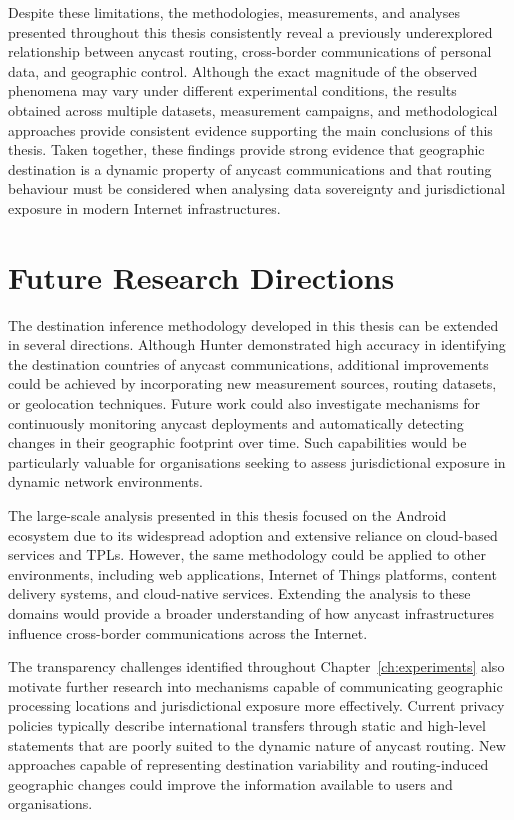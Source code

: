 Despite these limitations, the methodologies, measurements, and analyses presented throughout this thesis consistently reveal a previously underexplored relationship between anycast routing, cross-border communications of personal data, and geographic control. Although the exact magnitude of the observed phenomena may vary under different experimental conditions, the results obtained across multiple datasets, measurement campaigns, and methodological approaches provide consistent evidence supporting the main conclusions of this thesis. Taken together, these findings provide strong evidence that geographic destination is a dynamic property of anycast communications and that routing behaviour must be considered when analysing data sovereignty and jurisdictional exposure in modern Internet infrastructures.

\section{Future Research Directions}
\label{sc:conclusion_future}

The destination inference methodology developed in this thesis can be extended in several directions. Although Hunter demonstrated high accuracy in identifying the destination countries of anycast communications, additional improvements could be achieved by incorporating new measurement sources, routing datasets, or geolocation techniques. Future work could also investigate mechanisms for continuously monitoring anycast deployments and automatically detecting changes in their geographic footprint over time. Such capabilities would be particularly valuable for organisations seeking to assess jurisdictional exposure in dynamic network environments.

The large-scale analysis presented in this thesis focused on the Android ecosystem due to its widespread adoption and extensive reliance on cloud-based services and TPLs. However, the same methodology could be applied to other environments, including web applications, Internet of Things platforms, content delivery systems, and cloud-native services. Extending the analysis to these domains would provide a broader understanding of how anycast infrastructures influence cross-border communications across the Internet.

The transparency challenges identified throughout Chapter~\ref{ch:experiments} also motivate further research into mechanisms capable of communicating geographic processing locations and jurisdictional exposure more effectively. Current privacy policies typically describe international transfers through static and high-level statements that are poorly suited to the dynamic nature of anycast routing. New approaches capable of representing destination variability and routing-induced geographic changes could improve the information available to users and organisations.

